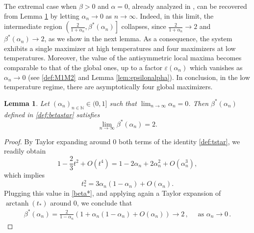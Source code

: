 \documentclass[11pt,oneside]{amsart}
\numberwithin{equation}{section}  %
\theoremstyle{plain}
\newtheorem{lemma}[theorem]{Lemma}
\theoremstyle{remark}
\def \N {{\mathbb N}}
\begin{document}
The extremal case when $\beta > 0$ and $\alpha = 0$, already analyzed in \cite{LS18}, can be recovered from Lemma \ref{lem:critical0} by letting $\alpha_n \to 0$ as $n \to \infty$. Indeed, in this limit, the intermediate region $\left ( \frac{2}{1+\alpha_n}, \beta^*(\alpha_n)\right]$ collapses, since $\frac{2}{1+\alpha_n} \to 2$ and $\beta^*(\alpha_n) \to 2$, as we show in the next lemma. As a consequence, the system exhibits a single maximizer at high temperatures and four maximizers at low temperatures.
Moreover, the value of the antisymmetric local maxima becomes comparable to that of the global ones, 
up to a factor $\varepsilon(\alpha_n)$  which vanishes as $\alpha_n \to 0$ (see \eqref{def:M1M2} and Lemma \ref{lem:epsilonalpha}). 
In conclusion, in the low temperature regime, there are asymptotically four global maximizers.

\begin{lemma}\label{lem:critical0}
Let $(\alpha_n)_{n \in \N} \in (0,1]$ such that $\lim_{n \to \infty} \alpha_n=0$. Then $\beta^*(\alpha_n)$ defined in \eqref{def:betastar} satisfies
\[
\lim_{n \to \infty}\beta^*(\alpha_n)=2.
\]
\end{lemma}
\begin{proof}
    By Taylor expanding around $0$ both terms of the identity \eqref{def:tstar}, we readily obtain
$$  
1-\frac{2}{3}t^2+O(t^4)= 1-2\alpha_n+2\alpha_n^2+O(\alpha_n^3),
$$ 
which implies
$$
t_*^2=3\alpha_n(1-\alpha_n)+O(\alpha_n).
$$
Plugging this value in \eqref{beta*}, and applying again a Taylor expansion of $\operatorname{arctanh}(t_*)$ around $0$, we conclude that
    \begin{align*}
        \beta^*(\alpha_n)%
        =\frac{2}{1-\alpha_n} \left (1+\alpha_n(1-\alpha_n)+O(\alpha_n)\right)
        \to 2\,,\quad \mbox{ as } \alpha_n \to 0\,.
    \end{align*}
\end{proof}
\end{document}
